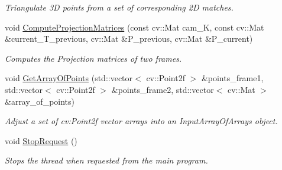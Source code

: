 \begin{DoxyCompactItemize}
\begin{DoxyCompactList}\small\item\em Triangulate 3D points from a set of corresponding 2D matches. \end{DoxyCompactList}\item 
void \hyperlink{classcoldetector_1_1CollisionDetector_a432e4c735be67180cc599c2353e00beb}{Compute\+Projection\+Matrices} (const cv\+::\+Mat cam\+\_\+K, const cv\+::\+Mat \&current\+\_\+\+T\+\_\+previous, cv\+::\+Mat \&P\+\_\+previous, cv\+::\+Mat \&P\+\_\+current)
\begin{DoxyCompactList}\small\item\em Computes the Projection matrices of two frames. \end{DoxyCompactList}\item 
void \hyperlink{classcoldetector_1_1CollisionDetector_abf7f01bfb82b58af9683d565a901659d}{Get\+Array\+Of\+Points} (std\+::vector$<$ cv\+::\+Point2f $>$ \&points\+\_\+frame1, std\+::vector$<$ cv\+::\+Point2f $>$ \&points\+\_\+frame2, std\+::vector$<$ cv\+::\+Mat $>$ \&array\+\_\+of\+\_\+points)
\begin{DoxyCompactList}\small\item\em Adjust a set of cv\+:Point2f vector arrays into an Input\+Array\+Of\+Arrays object. \end{DoxyCompactList}\item 
\mbox{\label{classcoldetector_1_1CollisionDetector_a94abb97b8bce8c4c839ba36696667adc}} 
void \hyperlink{classcoldetector_1_1CollisionDetector_a94abb97b8bce8c4c839ba36696667adc}{Stop\+Request} ()
\begin{DoxyCompactList}\small\item\em Stops the thread when requested from the main program. \end{DoxyCompactList}\end{DoxyCompactItemize}
